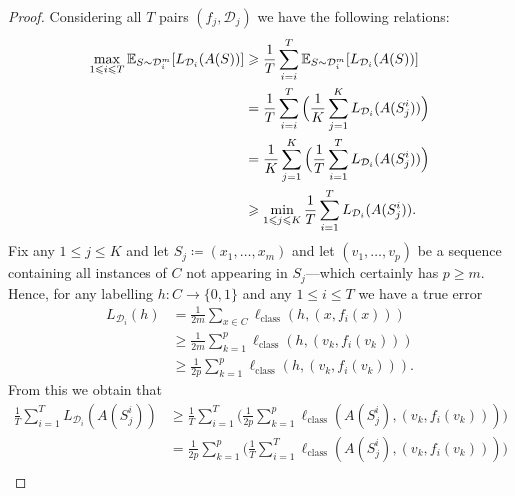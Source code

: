 \begin{proof}
    Considering all \(T\) pairs \((f_j, \mathcal{D}_j)\) we have the following
    relations:
    \begin{align}\label{eq:nfl-max-i-in-T}
        \nonumber
        \max_{1 \leqslant i \leqslant T} \operatorname{\mathbb{E}}_{S \sim \mathcal{D}_i^m}[L_{\mathcal{D}_i}(A(S))]
         & \geqslant \frac{1}{T} \sum_{i=i}^{T} \operatorname{\mathbb{E}}_{S \sim \mathcal{D}_i^m}[L_{\mathcal{D}_i}(A(S))]
        \\
        \nonumber
         & = \frac{1}{T} \sum_{i=i}^{T} \Big(
        \frac{1}{K} \sum_{j=1}^K L_{\mathcal{D}_i}(A(S_j^i))
        \Big)                                                                                        \\
        \nonumber
         & = \frac{1}{K} \sum_{j=1}^{K} \Big(
        \frac{1}{T} \sum_{i=1}^T L_{\mathcal{D}_i}(A(S_j^i))
        \Big)                                                                                        \\
         & \geqslant \min_{1 \leqslant j \leqslant K} \frac{1}{T} \sum_{i=1}^T L_{\mathcal{D}_i}(A(S_j^i)).
    \end{align}
    Fix any \(1 \leq j \leq K\) and let \(S_j \coloneq (x_1, \dots, x_m)\) and let
    \((v_1, \dots, v_p)\) be a sequence containing all instances of \(C\) not
    appearing in \(S_j\)---which certainly has \(p \geq m\). Hence, for any
    labelling \(h: C \to \{0, 1\}\) and any \(1 \leq i \leq T\) we have a true error
    \begin{align*}
        L_{\mathcal{D}_i}(h)
         & = \frac{1}{2m} \sum_{x \in C} \ell_{\text{class}}(h, (x, f_i(x)))        \\
         & \geq \frac{1}{2 m} \sum_{k=1}^p \ell_{\text{class}}(h, (v_k, f_i(v_k)))  \\
         & \geq \frac{1}{2 p} \sum_{k=1}^p \ell_{\text{class}}(h, (v_k, f_i(v_k))).
    \end{align*}
    From this we obtain that
    \begin{align}\label{eq:nfl-avg-true-loss-T}
        \nonumber
        \frac{1}{T} \sum_{i=1}^T L_{\mathcal{D}_i}(A(S_j^i))
         & \geq \frac{1}{T} \sum_{i=1}^T \Big(
        \frac{1}{2 p} \sum_{k=1}^p \ell_{\text{class}}(A(S_j^i), (v_k, f_i(v_k)))
        \Big)                                                  \\
        \nonumber
         & = \frac{1}{2 p} \sum_{k=1}^p \Big(
        \frac{1}{T} \sum_{i=1}^T \ell_{\text{class}}(A(S_j^i), (v_k, f_i(v_k)))
        \Big)                                                  \\

\end{align}
\end{proof}
